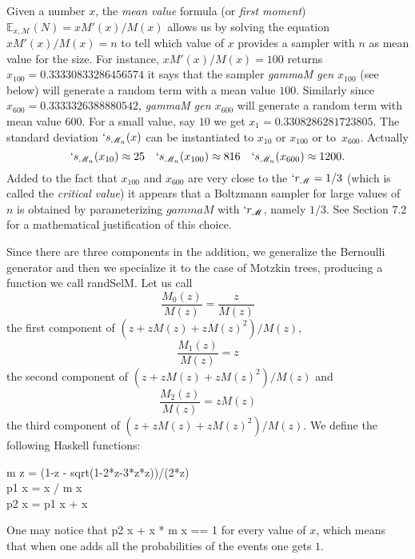 \documentclass{sig-alternate}
\newcommand{\M}{\mathscr{M}}
\newcommand{\Me}{\mathbb{E}}
\begin{document}
Given a number $x$, the \emph{mean value} formula (or \emph{first moment})
$\Me_{x,\M}(N) = x M'(x)/M(x)$ allows us by solving the equation $x M'(x)/M(x) = n$
to tell which value of $x$ provides a sampler with $n$ as mean value for the size.
For instance, $x M'(x)/M(x) = 100$ returns $x_{100} = 0.33330833286456574$ it says
that the sampler \emph{gammaM gen $x_{100}$} (see below) will generate a random term
with a mean value $100$.  Similarly since $x_{600} = 0.3333326388880542$,
\emph{gammaM gen $x_{600}$} will generate a random term with mean value $600$. For a
small value, say $10$ we get $x_{1}= 0.3308286281723805$.  The standard deviation
$`s_{\M_n}(x)$ can be instantiated to $x_{10}$ or $x_{100}$ or to~$x_{600}$.
Actually
\begin{displaymath}
  `s_{\M_n}(x_{10}) \approx 25 \quad `s_{\M_n}(x_{100}) \approx 816 \quad  `s_{\M_n}(x_{600}) \approx 1200.
\end{displaymath}
Added to the fact that $x_{100}$ and $x_{600}$ are very close to the $`r_{\M} = 1/3$
(which is called the \emph{critical value}) it appears that a Boltzmann sampler
for large values of $n$ is obtained by parameterizing $gammaM$ with $`r_{\M}$, namely
$1/3$.  See \cite{DBLP:journals/cpc/DuchonFLS04} Section 7.2 for a mathematical
justification of this choice.

Since there are three components in the addition, we generalize the Bernoulli
generator and then we specialize it to the case of Motzkin trees, producing a
function we call \<randSelM\>.  Let us call \[\frac{M_0(z)}{M(z)}=\frac{z}{M(z)}\]
the first component of $(z + z M(z) + z M(z)^2)/M(z)$, \[\frac{M_1(z)}{M(z)}=z\] the
second component of $(z + z M(z) + z M(z)^2)/M(z)$ and \[\frac{M_2(z)}{M(z)} = z
M(z)\] the third component of $(z + z M(z) + z M(z)^2)/M(z)$.  We define the
following \textsf{Haskell} functions:
\begin{haskell}
  m z = (1-z - sqrt(1-2*z-3*z*z))/(2*z) \\
  p1 x = x / m x \\
  p2 x = p1 x + x
\end{haskell}
One may notice that \<p2 x + x * m x == 1\> for every value of $x$, which means that
when one adds all the probabilities of the events one gets $1$.
\end{document}
